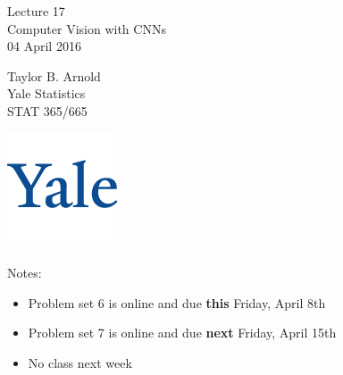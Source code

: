 \documentclass[xetex,mathserif,serif,aspectratio=169]{beamer}
\begin{document}
\begin{frame}[fragile] \frametitle{} \oldB \small

\vfill

{\fontsize{0.7cm}{0cm}\selectfont Lecture 17 \\\vspace{0.2cm}
Computer Vision with CNNs}\\\vspace{0.5cm}
04 April 2016

\vspace{2cm}

\begin{minipage}{0.6\textwidth}
Taylor B. Arnold \\
Yale Statistics \\
STAT 365/665
\end{minipage}
\hfill
\begin{minipage}{0.3\textwidth}\raggedleft
\includegraphics[scale=0.3]{../yale-logo.png}
\end{minipage}%

\end{frame}

\begin{frame}[fragile] \frametitle{} \oldB \small

Notes:
\begin{itemize}
\item Problem set 6 is online and due \textbf{this} Friday, April 8th
\item Problem set 7 is online and due \textbf{next} Friday, April 15th
\item No class next week
\end{itemize}

\end{frame}
\end{document}

